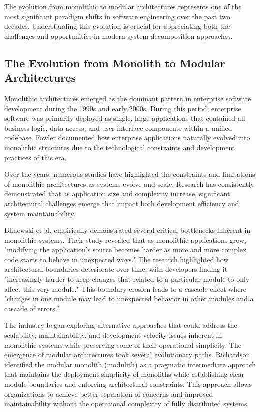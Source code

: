 The evolution from monolithic to modular architectures represents one of the most significant paradigm shifts in software engineering over the past two decades. Understanding this evolution is crucial for appreciating both the challenges and opportunities in modern system decomposition approaches.

\subsection{The Evolution from Monolith to Modular Architectures}
Monolithic architectures emerged as the dominant pattern in enterprise software development during the 1990s and early 2000s. During this period, enterprise software was primarily deployed as single, large applications that contained all business logic, data access, and user interface components within a unified codebase. Fowler \autocite{fowler2002patterns} documented how enterprise applications naturally evolved into monolithic structures due to the technological constraints and development practices of this era. 

Over the years, numerous studies have highlighted the constraints and limitations of monolithic architectures as systems evolve and scale. Research has consistently demonstrated that as application size and complexity increase, significant architectural challenges emerge that impact both development efficiency and system maintainability.

Blinowski et al. \autocite{Blinowski2022} empirically demonstrated several critical bottlenecks inherent in monolithic systems. Their study revealed that as monolithic applications grow, "modifying the application's source becomes harder as more and more complex code starts to behave in unexpected ways." The research highlighted how architectural boundaries deteriorate over time, with developers finding it "increasingly harder to keep changes that related to a particular module to only affect this very module." This boundary erosion leads to a cascade effect where "changes in one module may lead to unexpected behavior in other modules and a cascade of errors."

The industry began exploring alternative approaches that could address the scalability, maintainability, and development velocity issues inherent in monolithic systems while preserving some of their operational simplicity. The emergence of modular architectures took several evolutionary paths. Richardson \autocite{richardson2018microservices} identified the modular monolith (modulith) as a pragmatic intermediate approach that maintains the deployment simplicity of monoliths while establishing clear module boundaries and enforcing architectural constraints. This approach allows organizations to achieve better separation of concerns and improved maintainability without the operational complexity of fully distributed systems.

